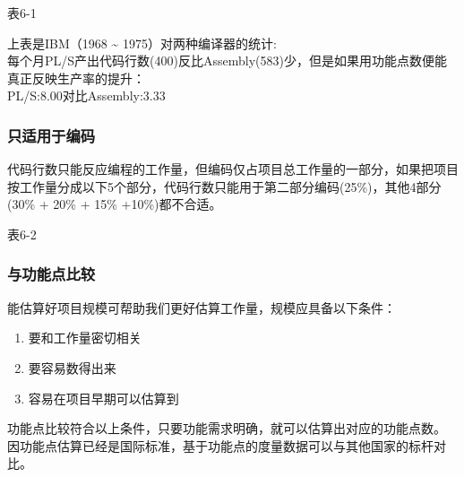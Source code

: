 表6-1

上表是IBM（1968 \textasciitilde{} 1975）对两种编译器的统计:\\
每个月PL/S产出代码行数(400)反比Assembly(583)少，但是如果用功能点数便能真正反映生产率的提升：\\
PL/S:8.00对比Assembly:3.33

\hypertarget{ux53eaux9002ux7528ux4e8eux7f16ux7801}{%
\subsubsection{只适用于编码}\label{ux53eaux9002ux7528ux4e8eux7f16ux7801}}

代码行数只能反应编程的工作量，但编码仅占项目总工作量的一部分，如果把项目按工作量分成以下5个部分，代码行数只能用于第二部分编码(25\%)，其他4部分(30\%
+ 20\% + 15\% +10\%)都不合适。


表6-2

\hypertarget{ux4e0eux529fux80fdux70b9ux6bd4ux8f83}{%
\subsubsection{与功能点比较}\label{ux4e0eux529fux80fdux70b9ux6bd4ux8f83}}

能估算好项目规模可帮助我们更好估算工作量，规模应具备以下条件：

\begin{enumerate}
\tightlist
\item
  要和工作量密切相关
\item
  要容易数得出来
\item
  容易在项目早期可以估算到\\
\end{enumerate}

功能点比较符合以上条件，只要功能需求明确，就可以估算出对应的功能点数。\\
因功能点估算已经是国际标准，基于功能点的度量数据可以与其他国家的标杆对比。

